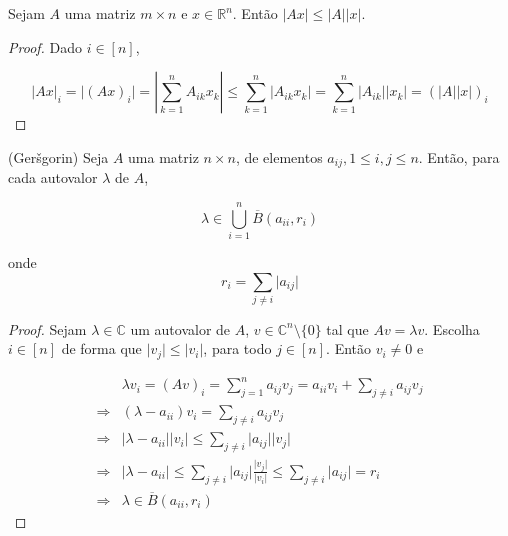 \begin{lema}
Sejam $A$ uma matriz $m \times n$ e $x \in \mathbb{R}^n$. Então $\vert Ax \vert \leq \vert A \vert \vert x \vert$.
\end{lema}
\begin{proof}
Dado $i \in [n]$,

$$ \vert Ax \vert_i = \vert (Ax)_i \vert = \left| \sum_{k = 1}^n A_{ik}x_k \right|
\leq  \sum_{k = 1}^n \vert A_{ik}x_k \vert 
=     \sum_{k = 1}^n \vert A_{ik} \vert \vert x_k \vert
=     (\vert A \vert \vert x \vert)_i
$$
\end{proof}

\begin{teorema}
(Ger\v{s}gorin) \cite{horn2012matrix} Seja $A$ uma matriz $n \times n$, de elementos $a_{ij}, 1\leq i,j \leq n$. Então, para cada autovalor $\lambda$ de $A$,

$$ \lambda \in \bigcup_{i = 1}^n \overline{B}(a_{ii}, r_i) $$

onde $$r_i = \sum_{j \neq i} \vert a_{ij} \vert$$
\end{teorema}
\begin{proof}
Sejam $\lambda \in \mathbb{C}$ um autovalor de $A$, $v \in \mathbb{C}^{n} \setminus \lbrace 0 \rbrace$ tal que $Av = \lambda v$. Escolha $i \in [n]$ de forma que $\vert v_j \vert \leq \vert v_i \vert$, para todo $j \in [n]$. Então $v_i \neq 0$ e

\begin{subequations}
\begin{align*}
& \lambda v_i = (Av)_i
= \sum_{j = 1}^n a_{ij}v_j
= a_{ii}v_i + \sum_{j \neq i} a_{ij}v_j
\\ \Rightarrow &
(\lambda - a_{ii})v_i = \sum_{j \neq i} a_{ij}v_j
\\ \Rightarrow &
\vert \lambda - a_{ii} \vert \vert v_i \vert \leq \sum_{j \neq i} \vert a_{ij} \vert \vert v_j \vert
\\ \Rightarrow &
\vert \lambda - a_{ii} \vert \leq
\sum_{j \neq i} \vert a_{ij} \vert \frac{ \vert v_j \vert}{\vert v_i \vert}
\leq \sum_{j \neq i} \vert a_{ij} \vert = r_i
\\ \Rightarrow &
\lambda \in \overline{B}(a_{ii}, r_i)
\end{align*}
\end{subequations}
\end{proof}

